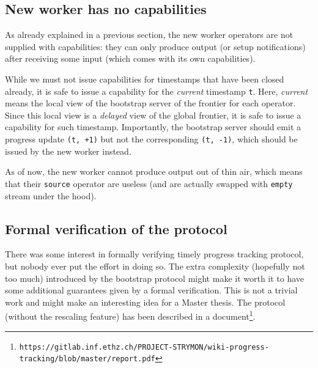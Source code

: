 \documentclass[12pt]{extarticle}
\begin{document}
\subsection{New worker has no capabilities}
As already explained in a previous section, the new worker operators are not supplied with capabilities: they can only produce
output (or setup notifications) after receiving some input (which comes with its own capabilities).

While we must not issue capabilities for timestamps that have been closed already, it is safe to issue a capability for the \textit{current} timestamp \verb|t|.
Here, \textit{current} means the local view of the bootstrap server of the frontier for each operator.
Since this local view is a \textit{delayed} view of the global frontier, it is safe to issue a capability for such timestamp.
Importantly, the bootstrap server should emit a progress update \verb|(t, +1)| but not the corresponding \verb|(t, -1)|,
which should be issued by the new worker instead.

As of now, the new worker cannot produce output out of thin air, which means that their \verb|source| operator are useless (and are
actually swapped with \verb|empty| stream under the hood).

\subsection{Formal verification of the protocol}
There was some interest in formally verifying timely progress tracking protocol, but nobody ever put the effort in doing so.
The extra complexity (hopefully not too much) introduced by the bootstrap protocol might make it worth it to have some additional
guarantees given by a formal verification. This is not a trivial work and might make an interesting idea for a Master thesis.
The protocol (without the rescaling feature) has been described in a document\footnote{\verb|https://gitlab.inf.ethz.ch/PROJECT-STRYMON/wiki-progress-tracking/blob/master/report.pdf|}.
\end{document}
